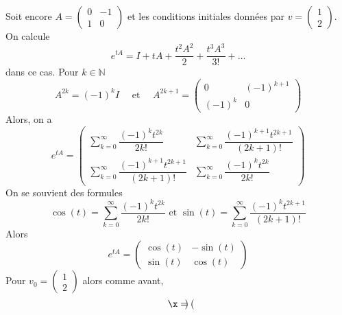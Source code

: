 \begin{example} 
  Soit encore 
  $A =
  \begin{pmatrix}
    0 & -1\\
    1 & 0
  \end{pmatrix}$ et les conditions initiales données par $v =  \left(\begin{smallmatrix}
    1\\2
  \end{smallmatrix}\right)$.
  On calcule 
  \begin{displaymath}
    e^{tA} =  I+tA+\dfrac{t^{2}A^{2}}{2}+\dfrac{t^{3}A^{3}}{3!}+\dots 
  \end{displaymath}
dans ce cas. 
Pour  $k∈ ℕ$ 
\begin{displaymath}
  A^{2k}=(-1)^{k} I  \quad \text{ et } \quad  A^{2k+1}=
\begin{pmatrix}
    0 & (-1)^{k+1}\\
    (-1)^{k} & 0
\end{pmatrix} 
\end{displaymath}
Alors, on a 
\begin{displaymath} 
  e^{tA} = 
  \begin{pmatrix} \displaystyle 
     \sum_{k=0}^{\infty}\dfrac{(-1)^{k}t^{2k}}{2k!} &  \displaystyle \sum_{k=0}^{\infty}\dfrac{(-1)^{k+1}t^{2k+1}}{(2k+1)!}\\
    \displaystyle \sum_{k=0}^{\infty}\dfrac{(-1)^{k+1}t^{2k+1}}{(2k+1)!} & \displaystyle \sum_{k=0}^{\infty}\dfrac{(-1)^{k}t^{2k}}{2k!}
\end{pmatrix}
\end{displaymath}
On se souvient des formules 
\begin{displaymath}
  \cos(t) =\displaystyle \sum_{k=0}^{\infty}\dfrac{(-1)^{k}t^{2k}}{2k!} \text{ et }\sin(t) =\displaystyle \sum_{k=0}^{\infty}\dfrac{(-1)^{k}t^{2k+1}}{(2k+1)!} 
\end{displaymath}
Alors
\begin{displaymath}
  e^{tA} = \begin{pmatrix}
    \cos(t)&-\sin(t)\\
    \sin(t)&\cos(t)
  \end{pmatrix}
\end{displaymath}
Pour  $v_0 = 
\begin{pmatrix}
    1\\
    2
\end{pmatrix} $ 
alors comme avant, 
\begin{displaymath}
  \x = \begin{pmatrix}

\end{pmatrix}
\end{displaymath}
\end{example}
